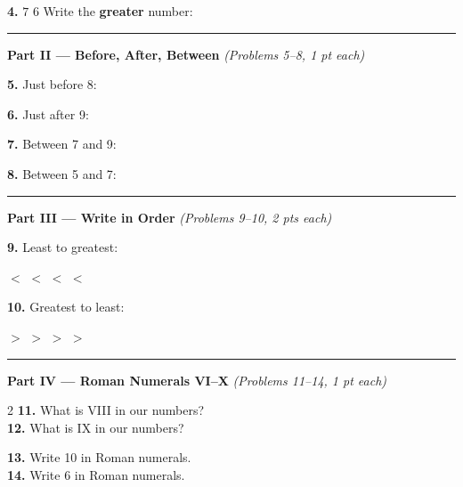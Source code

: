 \documentclass[12pt, letterpaper]{article}
\newcommand{\answerline}{\underline{\hspace{2.5cm}}}
\newcommand{\symbox}{\fbox{\hspace{0.7cm}}}
\newcommand{\numbox}{\fbox{\hspace{0.6cm}\vphantom{0}}}
\begin{document}
\bigskip
\noindent\textbf{4.} \quad $7$ \quad \symbox \quad $6$ \hspace{3cm}
Write the \textbf{greater} number: \answerline

\bigskip
\noindent\textcolor{scholared}{\rule{\linewidth}{0.4pt}}

\noindent\textcolor{scholared}{\large\textbf{Part II — Before, After, Between}} \hfill \textit{(Problems 5–8, 1 pt each)}

\bigskip
\noindent\textbf{5.} Just before 8: \hfill \answerline

\noindent\textbf{6.} Just after 9: \hfill \answerline

\noindent\textbf{7.} Between 7 and 9: \hfill \answerline

\noindent\textbf{8.} Between 5 and 7: \hfill \answerline

\bigskip
\noindent\textcolor{scholared}{\rule{\linewidth}{0.4pt}}

\noindent\textcolor{scholared}{\large\textbf{Part III — Write in Order}} \hfill \textit{(Problems 9–10, 2 pts each)}

\bigskip
\noindent\textbf{9.} Least to greatest:     

\medskip
\hspace{2em} \numbox \; $<$ \; \numbox \; $<$ \; \numbox \; $<$ \; \numbox \; $<$ \; \numbox

\bigskip
\noindent\textbf{10.} Greatest to least:     

\medskip
\hspace{2em} \numbox \; $>$ \; \numbox \; $>$ \; \numbox \; $>$ \; \numbox \; $>$ \; \numbox

\bigskip
\noindent\textcolor{scholared}{\rule{\linewidth}{0.4pt}}

\noindent\textcolor{scholared}{\large\textbf{Part IV — Roman Numerals VI–X}} \hfill \textit{(Problems 11–14, 1 pt each)}

\bigskip
\begin{multicols}{2}
\noindent\textbf{11.} What is VIII in our numbers? \hfill \answerline\\[12pt]
\noindent\textbf{12.} What is IX in our numbers? \hfill \answerline

\columnbreak

\noindent\textbf{13.} Write 10 in Roman numerals. \hfill \answerline\\[12pt]
\noindent\textbf{14.} Write 6 in Roman numerals. \hfill \answerline
\end{multicols}
\end{document}
